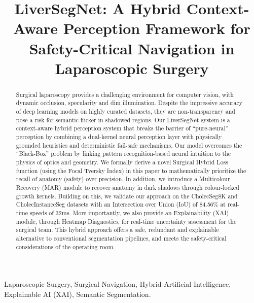 \documentclass[conference]{IEEEtran}
\begin{document}
\title{LiverSegNet: A Hybrid Context-Aware Perception Framework for Safety-Critical Navigation in Laparoscopic Surgery}

\author{
}

\maketitle

\begin{abstract}
Surgical laparoscopy provides a challenging environment for computer vision, with dynamic occlusion, specularity and dim illumination. Despite the impressive accuracy of deep learning models on highly curated datasets, they are non-transparency and pose a risk for semantic flicker in shadowed regions. Our LiverSegNet system is a context-aware hybrid perception system that breaks the barrier of ``pure-neural'' perception by combining a dual-kernel neural perception layer with physically grounded heuristics and deterministic fail-safe mechanisms. Our model overcomes the ``Black-Box'' problem by linking pattern recognition-based neural intuition to the physics of optics and geometry. We formally derive a novel Surgical Hybrid Loss function (using the Focal Tversky Index) in this paper to mathematically prioritize the recall of anatomy (safety) over precision. In addition, we introduce a Multicolour Recovery (MAR) module to recover anatomy in dark shadows through colour-locked growth kernels. Building on this, we validate our approach on the CholecSeg8K and CholecInstanceSeg datasets with an Intersection over Union (IoU) of 84.56\% at real-time speeds of 32ms. More importantly, we also provide an Explainability (XAI) module, through Heatmap Diagnostics, for real-time uncertainty assessment for the surgical team. This hybrid approach offers a safe, redundant and explainable alternative to conventional segmentation pipelines, and meets the safety-critical considerations of the operating room.
\end{abstract}

\begin{IEEEkeywords}
Laparoscopic Surgery, Surgical Navigation, Hybrid Artificial Intelligence, Explainable AI (XAI), Semantic Segmentation.
\end{IEEEkeywords}
\end{document}
